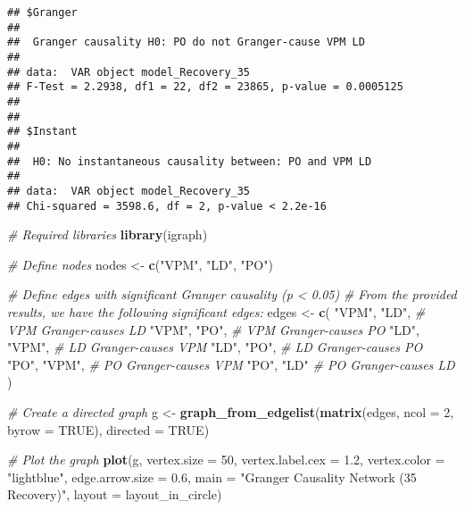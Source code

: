 \documentclass[
]{article}
\newenvironment{Shaded}{\begin{snugshade}}{\end{snugshade}}
\newcommand{\AttributeTok}[1]{\textcolor[rgb]{0.13,0.29,0.53}{#1}}
\newcommand{\CommentTok}[1]{\textcolor[rgb]{0.56,0.35,0.01}{\textit{#1}}}
\newcommand{\ConstantTok}[1]{\textcolor[rgb]{0.56,0.35,0.01}{#1}}
\newcommand{\DecValTok}[1]{\textcolor[rgb]{0.00,0.00,0.81}{#1}}
\newcommand{\FloatTok}[1]{\textcolor[rgb]{0.00,0.00,0.81}{#1}}
\newcommand{\FunctionTok}[1]{\textcolor[rgb]{0.13,0.29,0.53}{\textbf{#1}}}
\newcommand{\NormalTok}[1]{#1}
\newcommand{\OtherTok}[1]{\textcolor[rgb]{0.56,0.35,0.01}{#1}}
\newcommand{\StringTok}[1]{\textcolor[rgb]{0.31,0.60,0.02}{#1}}
\begin{document}
\begin{verbatim}
## $Granger
## 
##  Granger causality H0: PO do not Granger-cause VPM LD
## 
## data:  VAR object model_Recovery_35
## F-Test = 2.2938, df1 = 22, df2 = 23865, p-value = 0.0005125
## 
## 
## $Instant
## 
##  H0: No instantaneous causality between: PO and VPM LD
## 
## data:  VAR object model_Recovery_35
## Chi-squared = 3598.6, df = 2, p-value < 2.2e-16
\end{verbatim}

\begin{Shaded}
\begin{Highlighting}[]
\CommentTok{\# Required libraries}
\FunctionTok{library}\NormalTok{(igraph)}

\CommentTok{\# Define nodes}
\NormalTok{nodes }\OtherTok{\textless{}{-}} \FunctionTok{c}\NormalTok{(}\StringTok{"VPM"}\NormalTok{, }\StringTok{"LD"}\NormalTok{, }\StringTok{"PO"}\NormalTok{)}

\CommentTok{\# Define edges with significant Granger causality (p \textless{} 0.05)}
\CommentTok{\# From the provided results, we have the following significant edges:}
\NormalTok{edges }\OtherTok{\textless{}{-}} \FunctionTok{c}\NormalTok{(}
  \StringTok{"VPM"}\NormalTok{, }\StringTok{"LD"}\NormalTok{,  }\CommentTok{\# VPM Granger{-}causes LD}
  \StringTok{"VPM"}\NormalTok{, }\StringTok{"PO"}\NormalTok{,  }\CommentTok{\# VPM Granger{-}causes PO}
  \StringTok{"LD"}\NormalTok{, }\StringTok{"VPM"}\NormalTok{,  }\CommentTok{\# LD Granger{-}causes VPM}
  \StringTok{"LD"}\NormalTok{, }\StringTok{"PO"}\NormalTok{,   }\CommentTok{\# LD Granger{-}causes PO}
  \StringTok{"PO"}\NormalTok{, }\StringTok{"VPM"}\NormalTok{,  }\CommentTok{\# PO Granger{-}causes VPM}
  \StringTok{"PO"}\NormalTok{, }\StringTok{"LD"}    \CommentTok{\# PO Granger{-}causes LD}
\NormalTok{)}

\CommentTok{\# Create a directed graph}
\NormalTok{g }\OtherTok{\textless{}{-}} \FunctionTok{graph\_from\_edgelist}\NormalTok{(}\FunctionTok{matrix}\NormalTok{(edges, }\AttributeTok{ncol =} \DecValTok{2}\NormalTok{, }\AttributeTok{byrow =} \ConstantTok{TRUE}\NormalTok{), }\AttributeTok{directed =} \ConstantTok{TRUE}\NormalTok{)}

\CommentTok{\# Plot the graph}
\FunctionTok{plot}\NormalTok{(g,}
     \AttributeTok{vertex.size =} \DecValTok{50}\NormalTok{,}
     \AttributeTok{vertex.label.cex =} \FloatTok{1.2}\NormalTok{,}
     \AttributeTok{vertex.color =} \StringTok{"lightblue"}\NormalTok{,}
     \AttributeTok{edge.arrow.size =} \FloatTok{0.6}\NormalTok{,}
     \AttributeTok{main =} \StringTok{"Granger Causality Network (35 Recovery)"}\NormalTok{,}
     \AttributeTok{layout =}\NormalTok{ layout\_in\_circle)}
\end{Highlighting}
\end{Shaded}
\end{document}
